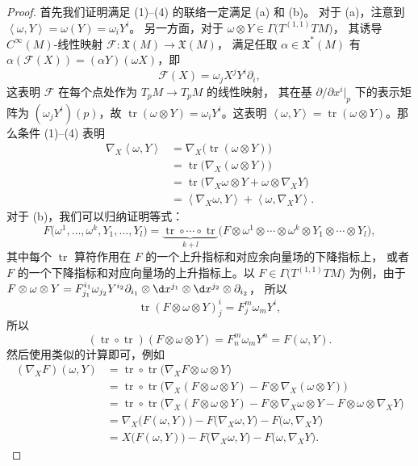 \documentclass[fontset=none]{Notes}
\DeclareMathOperator\tr{tr}
\newcommand{\inn}[1]{\left\langle #1\right\rangle}
\begin{document}
\begin{proof}
  首先我们证明满足 (1)--(4) 的联络一定满足 (a) 和 (b)。
  对于 (a)，注意到 $\inn{\omega,Y}=\omega(Y)=\omega_iY^i$。
  另一方面，对于 $\omega\otimes Y\in \Gamma\bigl(T^{(1,1)}TM\bigr)$，
  其诱导 $C^\infty(M)$-线性映射 $\mathcal{F}:\mathfrak{X}(M)\to \mathfrak{X}(M)$，
  满足任取 $\alpha\in \mathfrak{X}^*(M)$ 有
  $\alpha(\mathcal{F}(X))=(\alpha Y)(\omega X)$，即
  \[
    \mathcal{F}(X)=\omega_jX^j Y^i\partial_i,
  \]
  这表明 $\mathcal{F}$ 在每个点处作为 $T_pM\to T_pM$ 的线性映射，
  其在基 $\partial/\partial x^i|_p$ 下的表示矩阵为
  $(\omega_j Y^i)(p)$，故 $\tr(\omega\otimes Y)=\omega_iY^i$。这表明
  $\inn{\omega,Y}=\tr(\omega\otimes Y)$。那么条件 (1)--(4) 表明
  \begin{align*}
    \nabla_X\inn{\omega,Y}&=\nabla_X\bigl(\tr(\omega\otimes Y)\bigr)\\
    &=\tr\bigl(\nabla_X(\omega\otimes Y)\bigr)\\
    &=\tr\bigl(\nabla_X\omega\otimes Y+\omega\otimes\nabla_XY\bigr)\\
    &=\inn{\nabla_X\omega,Y}+\inn{\omega,\nabla_XY}.
  \end{align*}
  对于 (b)，我们可以归纳证明等式：
  \[
    F\bigl(\omega^1,\dots,\omega^k,Y_1,\dots,Y_l\bigr)=
    \underbrace{\tr\circ\cdots\circ\tr}_{k+l}
    \bigl(F\otimes\omega^1\otimes\cdots\otimes\omega^k\otimes Y_1\otimes\cdots\otimes Y_l\bigr),
  \]
  其中每个 $\tr$ 算符作用在 $F$ 的一个上升指标和对应余向量场的下降指标上，
  或者 $F$ 的一个下降指标和对应向量场的上升指标上。以 $F\in \Gamma\bigl(T^{(1,1)}TM\bigr)$
  为例，由于 $F\otimes\omega\otimes Y=F_{j_1}^{i_1}\omega_{j_2} Y^{i_2}\partial_{i_1}\otimes \d x^{j_1}\otimes \d x^{j_2}\otimes \partial_{i_2}$，
  所以
  \[
    \tr(F\otimes\omega\otimes Y)_j^i=
    F^m_{j}\omega_m Y^{i},
  \]
  所以 
  \[
    (\tr\circ\tr)(F\otimes\omega\otimes Y)=F_n^m\omega_m Y^n
    =F(\omega,Y).  
  \]
  然后使用类似的计算即可，例如
  \begin{align*}
    (\nabla_XF)(\omega,Y)&=\tr\circ\tr \bigl(\nabla_XF\otimes\omega\otimes Y\bigr)
    \\
    &=\tr\circ\tr \bigl(\nabla_X(F\otimes\omega\otimes Y)
    -F\otimes\nabla_X(\omega\otimes Y)\bigr)\\
    &=\tr\circ\tr \bigl(\nabla_X(F\otimes\omega\otimes Y)
    -F\otimes\nabla_X\omega\otimes Y-F\otimes\omega\otimes\nabla_XY\bigr)\\
    &=\nabla_X\bigl(F(\omega,Y)\bigr)-F\bigl(\nabla_X\omega,Y\bigr)
    -F\bigl(\omega,\nabla_XY\bigr)\\
    &=X\bigl(F(\omega,Y)\bigr)-F\bigl(\nabla_X\omega,Y\bigr)
    -F\bigl(\omega,\nabla_XY\bigr).
  \end{align*}


\end{proof}
\end{document}
